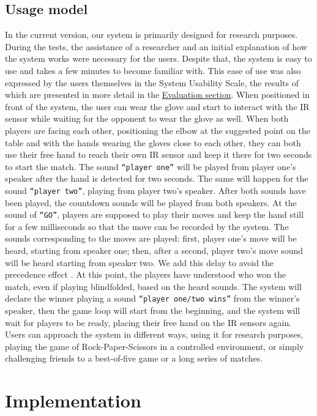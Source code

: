 \documentclass[11pt,a4paper]{report}
\begin{document}
\subsection*{Usage model}
In the current version, our system is primarily designed for research purposes. During the tests, the assistance of a researcher and an initial explanation of how the system works were necessary for the users. Despite that, the system is easy to use and takes a few minutes to become familiar with. This ease of use was also expressed by the users themselves in the System Usability Scale, the results of which are presented in more detail in the \hyperref[sec:Evaluation]{Evaluation section}.
When positioned in front of the system, the user can wear the glove and start to interact with the IR sensor while waiting for the opponent to wear the glove as well. When both players are facing each other, positioning the elbow at the suggested point on the table and with the hands wearing the gloves close to each other, they can both use their free hand to reach their own IR sensor and keep it there for two seconds to start the match. The sound \texttt{“player one”} will be played from player one’s speaker after the hand is detected for two seconds. The same will happen for the sound \texttt{“player two”}, playing from player two’s speaker. After both sounds have been played, the countdown sounds will be played from both speakers. At the sound of \texttt{“GO\!”}, players are supposed to play their moves and keep the hand still for a few milliseconds so that the move can be recorded by the system. The sounds corresponding to the moves are played: first, player one’s move will be heard, starting from speaker one; then, after a second, player two’s move sound will be heard starting from speaker two. We add this delay to avoid the precedence effect \cite*{1}. At this point, the players have understood who won the match, even if playing blindfolded, based on the heard sounds. The system will declare the winner playing a sound \texttt{“player one/two wins”} from the winner’s speaker, then the game loop will start from the beginning, and the system will wait for players to be ready, placing their free hand on the IR sensors again.
Users can approach the system in different ways, using it for research purposes, playing the game of Rock-Paper-Scissors in a controlled environment, or simply challenging friends to a best-of-five game or a long series of matches.

\section*{Implementation}\label{sec:Implementation}
\end{document}
